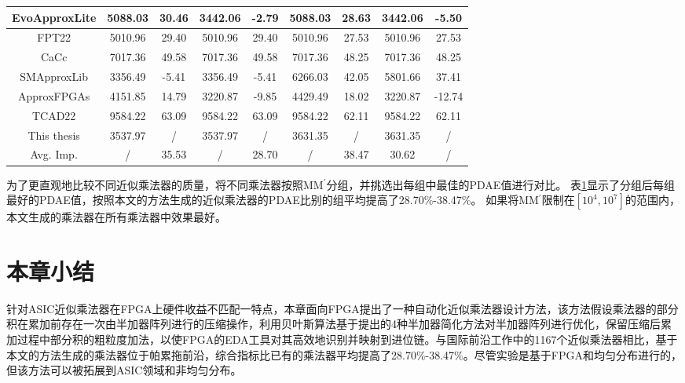\begin{table}[!htbp]
\begin{center}
{\begin{tabular}{|c|c|c|c|c|c|c|c|c|}
        \hline
        EvoApproxLite \cite{AC:AM:CGP_EvoLite} & 5088.03 & 30.46 & 3442.06 & -2.79 & 5088.03 & 28.63 & 3442.06 & -5.50 \\
        \hline
        FPT22 \cite{AC:AM:FPGA:FPT22} & 5010.96 & 29.40 & 5010.96 & 29.40 & 5010.96 & 27.53 & 5010.96 & 27.53 \\
        \hline
        CaCc \cite{AC:AM:FPGA:CaCc} & 7017.36 & 49.58 & 7017.36 & 49.58 & 7017.36 & 48.25 & 7017.36 & 48.25 \\
        \hline
        SMApproxLib \cite{AC:AM:FPGA:SMApproxLib} & 3356.49 & -5.41 & 3356.49 & -5.41 & 6266.03 & 42.05 & 5801.66 & 37.41 \\
        \hline
        ApproxFPGAs \cite{AC:AM:FPGA:ApproxFPGAs} & 4151.85 & 14.79 & 3220.87 & -9.85 & 4429.49 & 18.02 & 3220.87 & -12.74 \\
        \hline
        TCAD22 \cite{AC:AM:FPGA:TCAD22} & 9584.22 & 63.09 & 9584.22 & 63.09 & 9584.22 & 62.11 & 9584.22 & 62.11 \\
        \hline
        This thesis & 3537.97 & / & 3537.97 & / & 3631.35 & / & 3631.35 & / \\
        \hline
        Avg. Imp. & / & 35.53 & / & 28.70 & / & 38.47 & 30.62 & / \\
        \hline
        \end{tabular}
    }
        \label{AC:AM:FPGA:AMG:Table:PDAE}
        \end{center}
\end{table}


为了更直观地比较不同近似乘法器的质量，将不同乘法器按照MM$^\prime$分组，并挑选出每组中最佳的PDAE值进行对比。
表\ref{AC:AM:FPGA:AMG:Table:PDAE}显示了分组后每组最好的PDAE值，按照本文的方法生成的近似乘法器的PDAE比别的组平均提高了28.70\%-38.47\%。
如果将MM$^\prime$限制在$[10^4,10^7]$的范围内，本文生成的乘法器在所有乘法器中效果最好。


\section{本章小结}

针对ASIC近似乘法器在FPGA上硬件收益不匹配一特点，本章面向FPGA提出了一种自动化近似乘法器设计方法，该方法假设乘法器的部分积在累加前存在一次由半加器阵列进行的压缩操作，利用贝叶斯算法基于提出的4种半加器简化方法对半加器阵列进行优化，保留压缩后累加过程中部分积的粗粒度加法，以使FPGA的EDA工具对其高效地识别并映射到进位链。与国际前沿工作中的1167个近似乘法器相比，基于本文的方法生成的乘法器位于帕累拖前沿，综合指标比已有的乘法器平均提高了28.70\%-38.47\%。尽管实验是基于FPGA和均匀分布进行的，但该方法可以被拓展到ASIC领域和非均匀分布。
